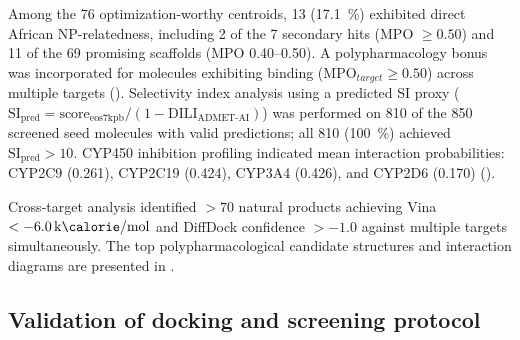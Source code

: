 \documentclass[journal=jcisd8,manuscript=article]{achemso}
\begin{document}
Among the \num{76} optimization-worthy centroids, \num{13} (\qty{17.1}{\percent}) exhibited direct African NP-relatedness, including \num{2} of the \num{7} secondary hits (MPO $\geq \num{0.50}$) and \num{11} of the \num{69} promising scaffolds (MPO \numrange{0.40}{0.50}). A polypharmacology bonus was incorporated for molecules exhibiting binding ($\text{MPO}_{target} \geq \num{0.50}$) across multiple targets (). Selectivity index analysis using a predicted SI proxy ($\text{SI}_{\text{pred}} = \text{score}_{\text{eos7kpb}} / (1 - \text{DILI}_{\text{ADMET-AI}})$) was performed on \num{810} of the \num{850} screened seed molecules with valid predictions; all \num{810} (\qty{100}{\percent}) achieved $\text{SI}_{\text{pred}} > \num{10}$. CYP450 inhibition profiling indicated mean interaction probabilities: CYP2C9 (\num{0.261}), CYP2C19 (\num{0.424}), CYP3A4 (\num{0.426}), and CYP2D6 (\num{0.170}) ().

Cross-target analysis identified $ > \num{70}$ natural products achieving Vina $< \qty{-6.0}{\kilo\calorie\per\mole}$ and DiffDock confidence $> \num{-1.0}$ against multiple targets simultaneously. The top polypharmacological candidate structures and interaction diagrams are presented in .

\subsection{Validation of docking and screening protocol}
\end{document}

